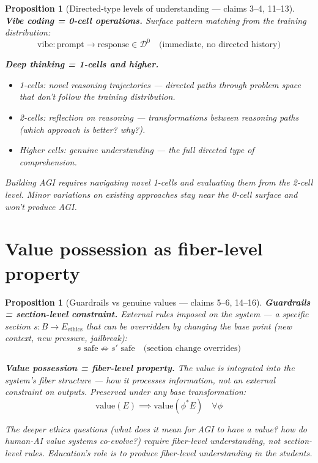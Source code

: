 \documentclass[11pt,a4paper]{article}
\newtheorem{proposition}[definition]{Proposition}
\begin{document}
\begin{proposition}[Directed-type levels of understanding --- claims 3--4, 11--13]
\label{prop:depth}
\textbf{Vibe coding = 0-cell operations.} Surface pattern matching from
the training distribution:
\[
  \text{vibe}: \text{prompt} \to \text{response} \in \mathcal{D}^0
  \quad \text{(immediate, no directed history)}
\]

\textbf{Deep thinking = 1-cells and higher.}
\begin{itemize}
  \item 1-cells: novel reasoning trajectories --- directed paths through
    problem space that don't follow the training distribution.
  \item 2-cells: reflection on reasoning --- transformations between
    reasoning paths (which approach is better? why?).
  \item Higher cells: genuine understanding --- the full directed type
    of comprehension.
\end{itemize}
Building AGI requires navigating novel 1-cells and evaluating them from
the 2-cell level. Minor variations on existing approaches stay near the
0-cell surface and won't produce AGI.
\end{proposition}

\section{Value possession as fiber-level property}

\begin{proposition}[Guardrails vs genuine values --- claims 5--6, 14--16]
\label{prop:values}
\textbf{Guardrails = section-level constraint.} External rules imposed
on the system --- a specific section $s: B \to E_{\text{ethics}}$ that
can be overridden by changing the base point (new context, new pressure,
jailbreak):
\[
  s \text{ safe} \not\Rightarrow s' \text{ safe} \quad \text{(section
    change overrides)}
\]

\textbf{Value possession = fiber-level property.} The value is integrated
into the system's fiber structure --- how it processes information, not
an external constraint on outputs. Preserved under any base
transformation:
\[
  \text{value}(E) \implies \text{value}(\phi^* E) \quad \forall \phi
\]

The deeper ethics questions (what does it mean for AGI to have a value?
how do human-AI value systems co-evolve?) require fiber-level
understanding, not section-level rules. Education's role is to produce
fiber-level understanding in the students.
\end{proposition}
\end{document}
